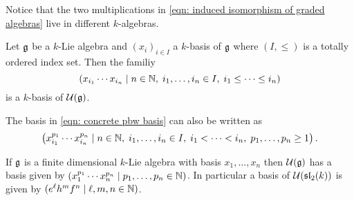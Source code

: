 \begin{rem}
 Notice that the two multiplications in \eqref{eqn: induced isomorphism of graded algebras} live in different $k$-algebras.
\end{rem}


\begin{thrm} \label{thrm: pbw concrete}
 Let $\mathfrak{g}$ be a $k$-Lie algebra and $(x_i)_{i \in I}$ a $k$-basis of $\mathfrak{g}$ where $(I,\leq)$ is a totally ordered index set. Then the familiy
 \begin{equation}\label{eqn: concrete pbw basis}
  \left(
   x_{i_1} \dotsm x_{i_n}
  \mid
   n \in \mathbb{N},\;
   i_1, \dotsc, i_n \in I,\;
   i_1 \leq \dotsb \leq i_n
  \right)
 \end{equation}
 is a $k$-basis of $\mathcal{U}(\mathfrak{g})$.
\end{thrm}


\begin{rem}
 The basis in \eqref{eqn: concrete pbw basis} can also be written as
 \[
  \left(
   x_{i_1}^{p_1} \dotsm x_{i_n}^{p_n}
  \mid
   n \in \mathbb{N},\;
   i_1, \dotsc, i_n \in I,\;
   i_1 < \dotsb < i_n,\;
   p_1, \dotsc, p_n \geq 1
  \right).
 \]
\end{rem}


\begin{expl}
 If $\mathfrak{g}$ is a finite dimensional $k$-Lie algebra with basis $x_1, \dotsc, x_n$ then $\mathcal{U}(\mathfrak{g})$ has a basis given by $(x_1^{p_1} \dotsm x_n^{p_n} \mid p_1, \dotsc, p_n \in \mathbb{N})$. In particular a basis of $\mathcal{U}(\mathfrak{sl}_2(k))$ is given by $(e^\ell h^m f^n \mid \ell, m ,n \in \mathbb{N})$.
\end{expl}


